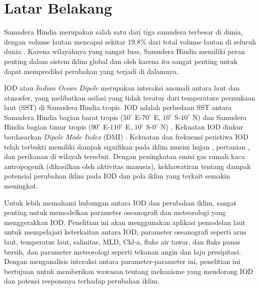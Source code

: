 \vspace{1.5pc}
\section[Latar Belakang]{Latar Belakang}
\begin{spacing}{1.5}
	Samudera Hindia merupakan salah satu dari tiga samudera terbesar di dunia, dengan volume lautan mencapai sekitar 19.8\% dari total volume lautan di seluruh dunia \cite{Eakins2010}. Karena wilayahnya yang sangat luas, Samudera Hindia memiliki peran penting dalam sistem iklim global dan oleh karena itu sangat penting untuk dapat memprediksi perubahan yang terjadi di dalamnya.
	
	IOD atau \textit{Indian Ocean Dipole} merupakan interaksi anomali antara laut dan atmosfer, yang melibatkan osilasi yang tidak teratur dari temperature permukaan laut (SST) di Samudera Hindia tropis. IOD adalah perbedaan SST antara Samudera Hindia bagian barat tropis ($50^\circ$ E-$70^\circ$ E, $10^\circ$ S-$10^\circ$ N) dan Samudera Hindia bagian timur tropis ($90^\circ$ E-$110^\circ$ E, $10^\circ$ S-$0^\circ$ N) \cite{Shunmugapandi2022,Thushara2020,Sattar2019}. Kekuatan IOD diukur berdasarkan \textit{Dipole Mode Index} (DMI) \cite{Saji1999}. Kekuatan dan frekuensi peristiwa IOD telah terbukti memiliki dampak signifikan pada iklim musim hujan \cite{Qiu2014}, pertanian \cite{Zhang2016}, dan perikanan \cite{Lan2013} di wilayah tersebut. Dengan peningkatan emisi gas rumah kaca antropogenik (dihasilkan oleh aktivitas manusia), kekhawatiran tentang dampak potensial perubahan iklim pada IOD dan pola iklim yang terkait semakin meningkat.
	
	Untuk lebih memahami hubungan antara IOD dan perubahan iklim, sangat penting untuk memodelkan parameter oseanografi dan meteorologi yang menggerakkan IOD. Penelitian ini akan menggunakan aplikasi pemodelan laut untuk mempelajari keterkaitan antara IOD, parameter oseanografi seperti arus laut, temperatur laut, salinitas, MLD, Chl-a, fluks air tawar, dan fluks panas bersih, dan parameter meteorologi seperti tekanan angin dan laju presipitasi. Dengan menganalisis interaksi antara parameter-parameter ini, penelitian ini bertujuan untuk memberikan wawasan tentang mekanisme yang mendorong IOD dan potensi responsnya terhadap perubahan iklim.
	

\end{spacing}

